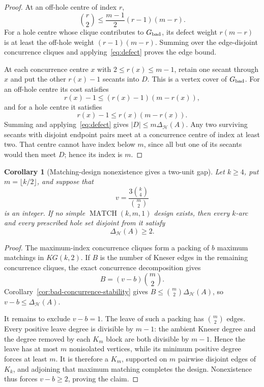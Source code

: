 \documentclass[11pt]{article}
\newtheorem{corollary}[theorem]{Corollary}
\theoremstyle{definition}
\theoremstyle{remark}
\newcommand{\cH}{\mathcal{H}}
\begin{document}
\begin{proof}
At an off-hole centre of index \(r\),
\[
 \binom r2\le\frac{m-1}{2}(r-1)(m-r).
\]
For a hole centre whose clique contributes to \(G_{\rm bad}\), its
defect weight \(r(m-r)\) is at least the off-hole weight
\((r-1)(m-r)\).  Summing over the edge-disjoint concurrence cliques and
applying~\eqref{eq:defect} proves the edge bound.

At each concurrence centre \(x\) with \(2\le r(x)\le m-1\), retain one
secant through \(x\) and put the other \(r(x)-1\) secants into \(D\).
This is a vertex cover of \(G_{\rm bad}\).  For an off-hole centre its
cost satisfies
\[
 r(x)-1\le (r(x)-1)(m-r(x)),
\]
and for a hole centre it satisfies
\[
 r(x)-1\le r(x)(m-r(x)).
\]
Summing and applying~\eqref{eq:defect} gives
\(|D|\le m\Delta_{\cH}(A)\).  Any two surviving secants with disjoint
endpoint pairs meet at a concurrence centre of index at least two.  That
centre cannot have index below \(m\), since all but one of its secants
would then meet \(D\); hence its index is \(m\).
\end{proof}

\begin{corollary}[Matching-design nonexistence gives a two-unit gap]
\label{cor:matching-nonexistence-gap}
Let $k\ge4$, put $m=\lfloor k/2\rfloor$, and suppose that
\[
 v=\frac{3\binom{k}{4}}{\binom m2}
\]
is an integer.  If no simple
\(\operatorname{MATCH}(k,m,1)\) design exists, then every $k$-arc and
every prescribed hole set disjoint from it satisfy
\[
 \Delta_{\cH}(A)\ge2.
\]
\end{corollary}

\begin{proof}
The maximum-index concurrence cliques form a packing of $b$ maximum
matchings in $KG(k,2)$.  If $B$ is the number of Kneser edges in the
remaining concurrence cliques, the exact concurrence decomposition gives
\[
 B=(v-b)\binom m2.
\]
Corollary~\ref{cor:bad-concurrence-stability} gives
$B\le\binom m2\Delta_{\cH}(A)$, so $v-b\le\Delta_{\cH}(A)$.

It remains to exclude $v-b=1$.  The leave of such a packing has
\(\binom m2\) edges.  Every positive leave degree is divisible by $m-1$:
the ambient Kneser degree and the degree removed by each $K_m$ block are
both divisible by $m-1$.  Hence the leave has at most $m$ nonisolated
vertices, while its minimum positive degree forces at least $m$.  It is
therefore a $K_m$, supported on $m$ pairwise disjoint edges of $K_k$,
and adjoining that maximum matching completes the design.  Nonexistence
thus forces $v-b\ge2$, proving the claim.
\end{proof}
\end{document}
